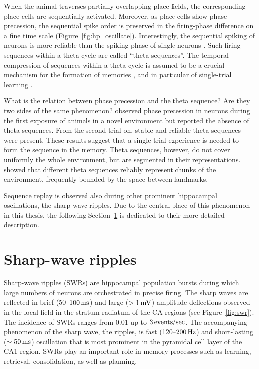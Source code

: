    When the animal traverses partially overlapping place fields, the
    corresponding place cells are sequentially activated. Moreover, as place
    cells show phase precession, the sequential spike order is preserved in the
    firing-phase difference on a fine time scale
    (Figure~\ref{fig:hp_oscillate}). Interestingly, the sequential spiking of
    neurons is more reliable than the spiking phase of single neurons
    \citep{Dragoi2006}. Such firing sequences within a theta cycle are called
    ``theta sequences''. The temporal compression of sequences within a theta
    cycle is assumed to be a crucial mechanism for the formation of memories
    \citep{Skaggs1996}, and in particular of single-trial learning
    \citep{Rutishauser2006}. 
    
    What is the relation between phase precession and the theta sequence? Are
    they two sides of the same phenomenon? \cite{Feng2015} observed phase
    precession in neurons during the first exposure of animals in a novel
    environment but reported the absence of theta sequences. From the second
    trial on, stable and reliable theta sequences were present. These results
    suggest that a single-trial experience is needed to form the sequence in
    the memory. Theta sequences, however, do not cover uniformly the whole
    environment, but are segmented in their representations. \cite{Gupta2012}
    showed that different theta sequences reliably represent chunks of the
    environment, frequently bounded by the space between landmarks.

    Sequence replay is observed also during other prominent hippocampal
    oscillations, the sharp-wave ripples. Due to the central place of this
    phenomenon in this thesis, the following Section~\ref{sec:swr} is dedicated
    to their more detailed description.

\section{Sharp-wave ripples}
\label{sec:swr}
  Sharp-wave ripples (SWRs) are hippocampal population bursts during which
  large numbers of neurons are orchestrated in precise firing. The sharp waves
  are reflected in brief (50--$100 \rm\,ms$) and large ($>1 \rm\, mV$)
  amplitude deflections observed in the local-field in the stratum radiatum of
  the CA regions (see Figure~\ref{fig:swr}). The incidence of SWRs ranges from
  0.01 up to $3 \rm \, events/sec$. The accompanying phenomenon of the sharp
  wave, the ripples, is fast (120--$200 \rm\, Hz$) and short-lasting ($\sim
  50\, \rm ms$) oscillation that is most prominent in the pyramidal cell
  layer of the CA1 region. SWRs play an important role in memory processes such
  as learning, retrieval, consolidation, as well as planning.

